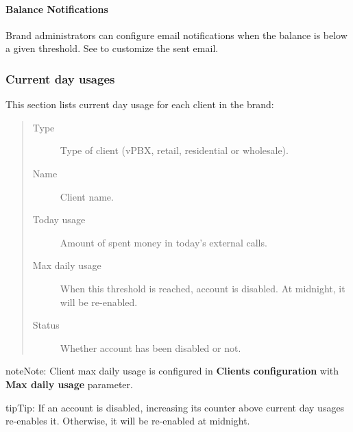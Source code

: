 \documentclass[letterpaper,10pt,english]{sphinxmanual}
\begin{document}
\paragraph{Balance Notifications}
\label{administration_portal/brand/billing/prepaid_balances:balance-notifications}
Brand administrators can configure email notifications when the balance is below a given threshold. See
{\hyperref[administration_portal/brand/settings/notification_templates:id1]{}} to customize the sent email.


\subsubsection{Current day usages}
\label{administration_portal/brand/billing/current_day_usages:current-day-usages}\label{administration_portal/brand/billing/current_day_usages::doc}\label{administration_portal/brand/billing/current_day_usages:id1}
This section lists current day usage for each client in the brand:
\begin{quote}
\begin{description}
\item[{Type}] \leavevmode
Type of client (vPBX, retail, residential or wholesale).

\item[{Name}] \leavevmode
Client name.

\item[{Today usage}] \leavevmode
Amount of spent money in today's external calls.

\item[{Max daily usage}] \leavevmode
When this threshold is reached, account is disabled. At midnight, it will be re-enabled.

\item[{Status}] \leavevmode
Whether account has been disabled or not.

\end{description}
\end{quote}

\begin{notice}{note}{Note:}
Client max daily usage is configured in \textbf{Clients configuration} with \textbf{Max daily usage} parameter.
\end{notice}

\begin{notice}{tip}{Tip:}
If an account is disabled, increasing its counter above current day usages re-enables it. Otherwise, it will be
re-enabled at midnight.
\end{notice}
\end{document}
